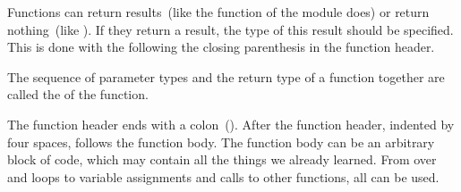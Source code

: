 Functions can return results~(like the  function of the  module does) or return nothing~(like ).
If they return a result, the type of this result should be specified.
This is done with the  \pythonIdx{->} following the closing parenthesis in the function header.%
%
\begin{definition}[Signature]%
The sequence of parameter types and the return type of a function together are called the  of the function.%
\end{definition}%
%
The function header ends with a colon~(\pythonilIdx{:}).%
%
%
%
After the function header, indented by four spaces, follows the function body.%
%
%
%
The function body can be an arbitrary block of code, which may contain all the things we already learned.
From  over  and  loops to variable assignments and calls to other functions, all can be used.

